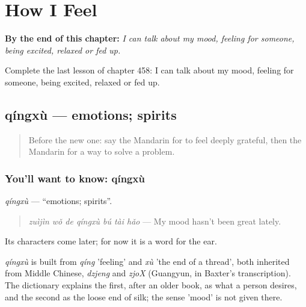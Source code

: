 
\chapter{How I Feel}
\label{ch:zh-how-i-feel}

\begin{chapteropening}
\textbf{By the end of this chapter:} \emph{I can talk about my mood, feeling for someone, being excited, relaxed or fed up.}

Complete the last lesson of chapter 458: I can talk about my mood, feeling for someone, being excited, relaxed or fed up.
\end{chapteropening}

\section[qíngxù]{qíngxù — emotions; spirits}

\label{lesson:ZH-C458-qingxu}



\begin{quote}
Before the new one: say the Mandarin for to feel deeply grateful, then the Mandarin for a way to solve a problem.
\end{quote}

\subsection*{You'll want to know: qíngxù}
\emph{qíngxù} — \textquotedblleft{}emotions; spirits\textquotedblright{}.

\begin{quote}
\emph{zuìjìn wǒ de qíngxù bú tài hǎo} — My mood hasn't been great lately.
\end{quote}

Its characters come later; for now it is a word for the ear.

\begin{cousinweb}
\emph{qíngxù} is built from \emph{qíng} 'feeling' and \emph{xù} 'the end of a thread', both inherited from Middle Chinese, \emph{dzjeng} and \emph{zjoX} (Guangyun, in Baxter's transcription). The dictionary explains the first, after an older book, as what a person desires, and the second as the loose end of silk; the sense 'mood' is not given there.
\end{cousinweb}

